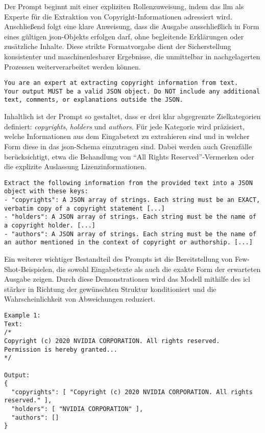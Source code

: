 Der Prompt beginnt mit einer expliziten Rollenzuweisung, indem das \gls{llm} als Experte für die Extraktion von Copyright-Informationen adressiert wird.
Anschließend folgt eine klare Anweisung, dass die Ausgabe ausschließlich in Form eines gültigen \gls{json}-Objekts erfolgen darf, ohne begleitende Erklärungen oder zusätzliche Inhalte.
Diese strikte Formatvorgabe dient der Sicherstellung konsistenter und maschinenlesbarer Ergebnisse, die unmittelbar in nachgelagerten Prozessen weiterverarbeitet werden können.

\begin{lstlisting}[keepspaces=true]
You are an expert at extracting copyright information from text.
Your output MUST be a valid JSON object. Do NOT include any additional text, comments, or explanations outside the JSON.
\end{lstlisting}

Inhaltlich ist der Prompt so gestaltet, dass er drei klar abgegrenzte Zielkategorien definiert: \textit{copyrights}, \textit{holders} und \textit{authors}.
Für jede Kategorie wird präzisiert, welche Informationen aus dem Eingabetext zu extrahieren sind und in welcher Form diese in das \gls{json}-Schema einzutragen sind.
Dabei werden auch Grenzfälle berücksichtigt, etwa die Behandlung von \enquote{All Rights Reserved}-Vermerken oder die explizite Auslassung Lizenzinformationen.

\begin{lstlisting}[keepspaces=true]
Extract the following information from the provided text into a JSON object with these keys:
- "copyrights": A JSON array of strings. Each string must be an EXACT, verbatim copy of a copyright statement [...]
- "holders": A JSON array of strings. Each string must be the name of a copyright holder. [...]
- "authors": A JSON array of strings. Each string must be the name of an author mentioned in the context of copyright or authorship. [...]
\end{lstlisting}

Ein weiterer wichtiger Bestandteil des Prompts ist die Bereitstellung von Few-Shot-Beispielen, die sowohl Eingabetexte als auch die exakte Form der erwarteten Ausgabe zeigen.
Durch diese Demonstrationen wird das Modell mithilfe des \gls{icl} stärker in Richtung der gewünschten Struktur konditioniert und die Wahrscheinlichkeit von Abweichungen reduziert.

\begin{lstlisting}[keepspaces=true]
Example 1:
Text:
/*
Copyright (c) 2020 NVIDIA CORPORATION. All rights reserved.
Permission is hereby granted...
*/

Output:
{
  "copyrights": [ "Copyright (c) 2020 NVIDIA CORPORATION. All rights reserved." ],
  "holders": [ "NVIDIA CORPORATION" ],
  "authors": []
}
\end{lstlisting}

